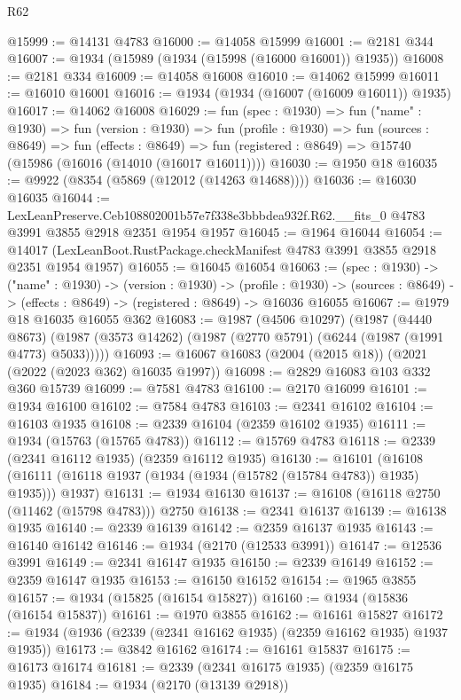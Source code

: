\begin{lexlean}{R62}
\begin{coremodule}
@15999 := @14131 @4783
@16000 := @14058 @15999
@16001 := @2181 @344
@16007 := @1934 (@15989 (@1934 (@15998 (@16000 @16001)) @1935))
@16008 := @2181 @334
@16009 := @14058 @16008
@16010 := @14062 @15999
@16011 := @16010 @16001
@16016 := @1934 (@1934 (@16007 (@16009 @16011)) @1935)
@16017 := @14062 @16008
@16029 := fun (spec : @1930) =>
  fun ("name" : @1930) =>
  fun (version : @1930) =>
  fun (profile : @1930) =>
  fun (sources : @8649) =>
  fun (effects : @8649) =>
  fun (registered : @8649) => @15740 (@15986 (@16016 (@14010 (@16017 @16011))))
@16030 := @1950 @18
@16035 := @9922 (@8354 (@5869 (@12012 (@14263 @14688))))
@16036 := @16030 @16035
@16044 := LexLeanPreserve.Ceb108802001b57e7f338e3bbbdea932f.R62.__fits_0
    @4783
    @3991
    @3855
    @2918
    @2351
    @1954
    @1957
@16045 := @1964 @16044
@16054 := @14017 (LexLeanBoot.RustPackage.checkManifest @4783 @3991 @3855 @2918 @2351 @1954 @1957)
@16055 := @16045 @16054
@16063 := (spec : @1930) ->
  ("name" : @1930) ->
  (version : @1930) ->
  (profile : @1930) ->
  (sources : @8649) -> (effects : @8649) -> (registered : @8649) -> @16036 @16055
@16067 := @1979 @18 @16035 @16055 @362
@16083 := @1987
    (@4506 @10297)
    (@1987
      (@4440 @8673)
      (@1987 (@3573 @14262) (@1987 (@2770 @5791) (@6244 (@1987 (@1991 @4773) @5033)))))
@16093 := @16067 @16083 (@2004 (@2015 @18)) (@2021 (@2022 (@2023 @362) @16035 @1997))
@16098 := @2829 @16083 @103 @332 @360 @15739
@16099 := @7581 @4783
@16100 := @2170 @16099
@16101 := @1934 @16100
@16102 := @7584 @4783
@16103 := @2341 @16102
@16104 := @16103 @1935
@16108 := @2339 @16104 (@2359 @16102 @1935)
@16111 := @1934 (@15763 (@15765 @4783))
@16112 := @15769 @4783
@16118 := @2339 (@2341 @16112 @1935) (@2359 @16112 @1935)
@16130 := @16101
    (@16108 (@16111 (@16118 @1937 (@1934 (@1934 (@15782 (@15784 @4783)) @1935) @1935))) @1937)
@16131 := @1934 @16130
@16137 := @16108 (@16118 @2750 (@11462 (@15798 @4783))) @2750
@16138 := @2341 @16137
@16139 := @16138 @1935
@16140 := @2339 @16139
@16142 := @2359 @16137 @1935
@16143 := @16140 @16142
@16146 := @1934 (@2170 (@12533 @3991))
@16147 := @12536 @3991
@16149 := @2341 @16147 @1935
@16150 := @2339 @16149
@16152 := @2359 @16147 @1935
@16153 := @16150 @16152
@16154 := @1965 @3855
@16157 := @1934 (@15825 (@16154 @15827))
@16160 := @1934 (@15836 (@16154 @15837))
@16161 := @1970 @3855
@16162 := @16161 @15827
@16172 := @1934 (@1936 (@2339 (@2341 @16162 @1935) (@2359 @16162 @1935) @1937 @1935))
@16173 := @3842 @16162
@16174 := @16161 @15837
@16175 := @16173 @16174
@16181 := @2339 (@2341 @16175 @1935) (@2359 @16175 @1935)
@16184 := @1934 (@2170 (@13139 @2918))

\end{coremodule}
\end{lexlean}
